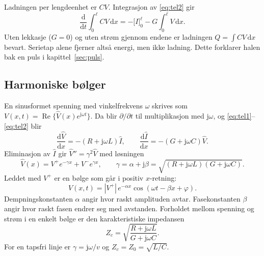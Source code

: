 \documentclass[11pt,a4paper]{article}
\numberwithin{equation}{section}
\numberwithin{figure}{section}
\numberwithin{table}{section}
\newcommand{\dd}{\mathrm{d}}
\newcommand{\jj}{\mathrm{j}}
\renewcommand{\Re}{\operatorname{Re}}
\begin{document}
Ladningen per lengdeenhet er $CV$. Integrasjon av \eqref{eq:tel2} gir
\begin{equation}
  \frac{\dd}{\dd t}\int_0^\ell CV\,\dd x = -\Big[I\Big]_0^\ell - G\int_0^\ell V\,\dd x. \label{eq:ladning}
\end{equation}
Uten lekkasje ($G = 0$) og uten strøm gjennom endene er ladningen
$Q = \int CV\,\dd x$ bevart. Serietap alene fjerner altså energi, men ikke
ladning. Dette forklarer halen bak en puls i kapittel~\ref{sec:puls}.

\subsection{Harmoniske bølger}\label{sec:harmonisk}
En sinusformet spenning med vinkelfrekvens $\omega$ skrives som
$V(x,t) = \Re\{\hat V(x)e^{\jj\omega t}\}$. Da blir $\partial/\partial t$ til
multiplikasjon med $\jj\omega$, og \eqref{eq:tel1}--\eqref{eq:tel2} blir
\begin{equation}
  \frac{\dd\hat V}{\dd x} = -(R + \jj\omega L)\hat I, \qquad
  \frac{\dd\hat I}{\dd x} = -(G + \jj\omega C)\hat V.
\end{equation}
Eliminasjon av $\hat I$ gir $\hat V'' = \gamma^2\hat V$ med løsningen
\begin{equation}
  \hat V(x) = V^+e^{-\gamma x} + V^-e^{\gamma x}, \qquad
  \gamma = \alpha + \jj\beta = \sqrt{(R + \jj\omega L)(G + \jj\omega C)}. \label{eq:gamma}
\end{equation}
Leddet med $V^+$ er en bølge som går i positiv $x$-retning:
\begin{equation}
  V(x,t) = |V^+|\,e^{-\alpha x}\cos(\omega t - \beta x + \varphi).
\end{equation}
Dempningskonstanten $\alpha$ angir hvor raskt amplituden avtar. Fasekonstanten
$\beta$ angir hvor raskt fasen endrer seg med avstanden. Forholdet mellom spenning
og strøm i en enkelt bølge er den karakteristiske impedansen
\begin{equation}
  Z_c = \sqrt{\frac{R + \jj\omega L}{G + \jj\omega C}}. \label{eq:Zc}
\end{equation}
For en tapsfri linje er $\gamma = \jj\omega/v$ og $Z_c = Z_0 = \sqrt{L/C}$.
\end{document}
